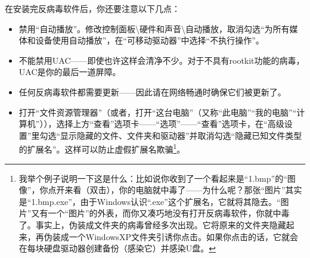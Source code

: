 \documentclass{book}
\begin{document}
在安装完反病毒软件后，你还要注意以下几点：
\begin{itemize}
	\item 禁用“自动播放”。修改控制面板\textbackslash 硬件和声音\textbackslash 自动播放，取消勾选“为所有媒体和设备使用自动播放”，在“可移动驱动器”中选择“不执行操作”。
	\item 不能禁用UAC——即使也许这样会清净不少。对于不具有rootkit功能的病毒，UAC是你的最后一道屏障。
	\item 任何反病毒软件都需要更新——因此请在网络畅通时确保它们被更新了。
	\item 打开“文件资源管理器”（或者，打开“这台电脑”（又称“此电脑”“我的电脑”“计算机”）），选择上方“查看”选项卡——“选项”——“查看”选项卡，在“高级设置”里勾选“显示隐藏的文件、文件夹和驱动器”并取消勾选“隐藏已知文件类型的扩展名”。这样可以防止虚假扩展名欺骗\footnote{我举个例子说明一下这是什么：比如说你收到了一个看起来是“1.bmp”的“图像”，你点开来看（双击），你的电脑就中毒了——为什么呢？那张“图片”其实是“1.bmp.exe”，由于Windows认识“.exe”这个扩展名，它就将其隐去。“图片”又有一个“图片”的外表，而你又凑巧地没有打开反病毒软件，你就中毒了。事实上，伪装成文件夹的病毒曾经多次出现。它将原来的文件夹隐藏起来，再伪装成一个WindowsXP文件夹引诱你点击。如果你点击的话，它就会在每块硬盘驱动器创建备份（感染它）并感染U盘。}。
\end{itemize}
\end{document}
